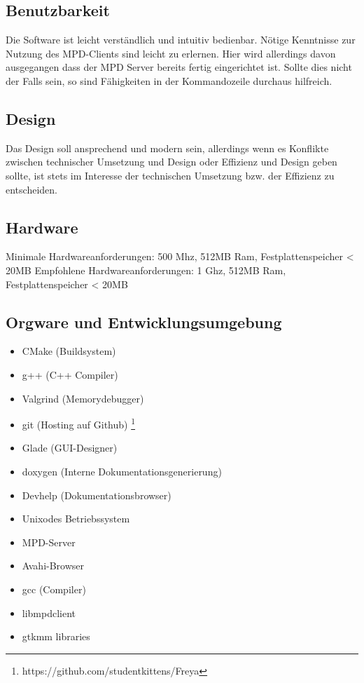 \subsection{Benutzbarkeit}
Die Software ist leicht verständlich und intuitiv bedienbar. Nötige Kenntnisse zur Nutzung des 
MPD-Clients sind leicht zu erlernen. Hier wird allerdings davon ausgegangen dass der MPD Server bereits
fertig eingerichtet ist. Sollte dies nicht der Falls sein, so sind Fähigkeiten in der Kommandozeile 
durchaus hilfreich.

\subsection{Design}
Das Design soll ansprechend und modern sein, allerdings wenn es Konflikte zwischen technischer Umsetzung 
und Design oder Effizienz und Design geben sollte, ist stets im Interesse der technischen Umsetzung bzw. 
der Effizienz zu entscheiden.
\subsection{Hardware}
Minimale Hardwareanforderungen: 500 Mhz, 512MB Ram, Festplattenspeicher < 20MB
Empfohlene Hardwareanforderungen: 1 Ghz, 512MB Ram, Festplattenspeicher < 20MB

\subsection{Orgware und Entwicklungsumgebung}
\begin{itemize}
	\item CMake (Buildsystem)
	\item g++ (C++ Compiler)
	\item Valgrind (Memorydebugger)
	\item git (Hosting auf Github) \footnote{https://github.com/studentkittens/Freya}
	\item Glade (GUI-Designer)
	\item doxygen  (Interne Dokumentationsgenerierung)
	\item Devhelp (Dokumentationsbrowser)
	\item Unixodes Betriebssystem
    	\item MPD-Server	
    	\item Avahi-Browser
    	\item gcc (Compiler)
    	\item libmpdclient
    	\item gtkmm libraries
\end{itemize}

